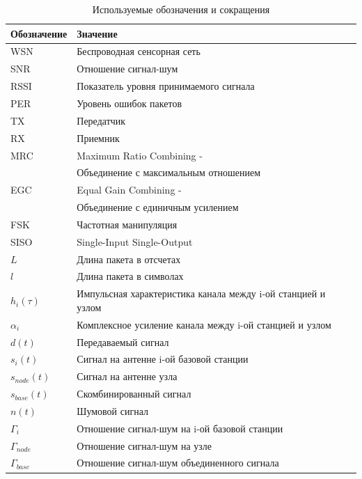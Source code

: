 \documentclass[a4paper,12pt,oneside, abstract=true]{scrartcl}
\begin{document}
\begin{table}[!htb]
\centering
\caption{Используемые обозначения и сокращения}
\label{designations}
    \begin{tabular}{|l|l|}
    \hline
    Обозначение & Значение \\ \hline
    WSN & Беспроводная сенсорная сеть \\
    SNR & Отношение сигнал-шум \\
    RSSI & Показатель уровня принимаемого сигнала \\
    PER & Уровень ошибок пакетов \\
    TX & Передатчик \\
    RX & Приемник \\
    MRC & Maximum Ratio Combining - \\
    & Объединение с максимальным отношением\\
    EGC & Equal Gain Combining -\\
    & Объединение с единичным усилением\\
    FSK & Частотная манипуляция \\
    SISO & Single-Input Single-Output\\
    $L$ & Длина пакета в отсчетах \\
    $l$ & Длина пакета в символах \\
    $h_i(\tau)$ & Импульсная характеристика канала между i-ой станцией и узлом\\
    $\alpha_i$ & Комплексное усиление канала между i-ой станцией и узлом\\
	$d(t)$ & Передаваемый сигнал \\	
	$s_i(t)$ & Сигнал на антенне i-ой базовой станции \\
	$s_{node}(t)$ & Сигнал на антенне узла \\
	$s_{base}(t)$ & Скомбинированный сигнал \\
	$n(t)$ & Шумовой сигнал \\
	$\Gamma_i$ & Отношение сигнал-шум на i-ой базовой станции \\
	$\Gamma_{node}$ & Отношение сигнал-шум на узле \\
	$\Gamma_{base}$ & Отношение сигнал-шум объединенного сигнала \\
    \hline
    \end{tabular}
\end{table}
\cleardoublepage
\end{document}

